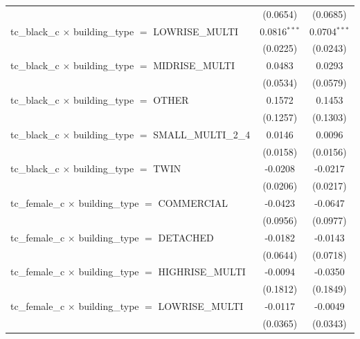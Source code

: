 \begin{tabular}{lcc}
                                                                       & (0.0654)       & (0.0685)\\   
   tc\_black\_c $\times$ building\_type $=$ LOWRISE\_MULTI             & 0.0816$^{***}$ & 0.0704$^{***}$\\   
                                                                       & (0.0225)       & (0.0243)\\   
   tc\_black\_c $\times$ building\_type $=$ MIDRISE\_MULTI             & 0.0483         & 0.0293\\   
                                                                       & (0.0534)       & (0.0579)\\   
   tc\_black\_c $\times$ building\_type $=$ OTHER                      & 0.1572         & 0.1453\\   
                                                                       & (0.1257)       & (0.1303)\\   
   tc\_black\_c $\times$ building\_type $=$ SMALL\_MULTI\_2\_4         & 0.0146         & 0.0096\\   
                                                                       & (0.0158)       & (0.0156)\\   
   tc\_black\_c $\times$ building\_type $=$ TWIN                       & -0.0208        & -0.0217\\   
                                                                       & (0.0206)       & (0.0217)\\   
   tc\_female\_c $\times$ building\_type $=$ COMMERCIAL                & -0.0423        & -0.0647\\   
                                                                       & (0.0956)       & (0.0977)\\   
   tc\_female\_c $\times$ building\_type $=$ DETACHED                  & -0.0182        & -0.0143\\   
                                                                       & (0.0644)       & (0.0718)\\   
   tc\_female\_c $\times$ building\_type $=$ HIGHRISE\_MULTI           & -0.0094        & -0.0350\\   
                                                                       & (0.1812)       & (0.1849)\\   
   tc\_female\_c $\times$ building\_type $=$ LOWRISE\_MULTI            & -0.0117        & -0.0049\\   
                                                                       & (0.0365)       & (0.0343)\\   

\end{tabular}
